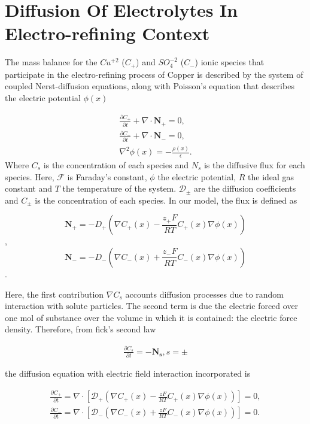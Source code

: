 \section{Diffusion Of Electrolytes In Electro-refining Context}

The mass balance for the $Cu^{+2}$ ($C_{+}$) and $SO_{4}^{-2}$ ($C_{-}$) ionic species that participate in the electro-refining process of Copper is described by the system of coupled Nerst-diffusion equations, along with Poisson's equation that describes the electric potential $\phi(x)$

\begin{eqnarray}
\frac{\partial C_+}{\partial t}+\nabla\cdot \mathbf{N}_+ = 0, \\
\frac{\partial C_-}{\partial t}+\nabla\cdot \mathbf{N}_- = 0, \\
\nabla^2\phi(x)=-\frac{\rho(x)}{\epsilon}.
\end{eqnarray}
Where $C_s$ is the concentration of each species and $N_s$ is the diffusive flux for each species. Here, $\mathcal{F}$ is Faraday's constant, $\phi$ the electric potential, $R$ the ideal gas constant and $T$ the temperature of the system. $\mathcal{D}_\pm$ are the diffusion coefficients and $C_\pm$ is the concentration of each species. 
In our model, the flux is defined as

$$\mathbf{N}_+= -D_+\left(\nabla C_+(x) -\frac{z_+ F}{RT}C_+(x)\nabla\phi(x)\right)$$,
$$\mathbf{N}_-= -D_-\left(\nabla C_-(x) +\frac{z_- F}{RT}C_-(x)\nabla\phi(x)\right)$$.

Here, the first contribution $\nabla C_s$ accounts diffusion processes due to random interaction with solute particles. The second term is due the electric forced over one mol of substance over the volume in which it is contained: the electric force density. Therefore, from fick's second law

\begin{eqnarray}
\frac{\partial C_s}{\partial t}= -\mathbf{N_s}, s=\pm
\end{eqnarray}

the diffusion equation with electric field interaction incorporated is \cite{Dolde2011}

\begin{eqnarray}
\frac{\partial C_+}{\partial t}=\nabla\cdot\left[ \mathcal{D}_+\left(\nabla C_+(x) -\frac{z F}{RT}C_+(x)\nabla\phi(x)\right)\right]= 0, \\
\frac{\partial C_-}{\partial t}=\nabla\cdot\left[ \mathcal{D}_-\left(\nabla C_-(x) +\frac{z F}{RT}C_-(x)\nabla\phi(x)\right)\right] = 0.
\end{eqnarray}

